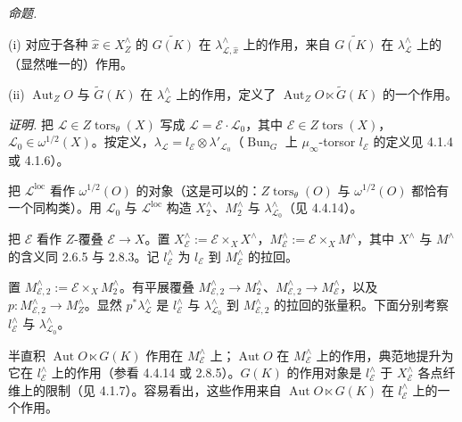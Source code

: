  \emph{命题.}

(i) 对应于各种 $\hat x\in X_{Z}^{\wedge}$ 的 $\widetilde{G(K)}$ 在 $\lambda_{\mathcal{L},\hat x}^{\wedge}$ 上的作用，来自 $\widetilde{G(K)}$ 在 $\lambda_{\mathcal{L}}^{\wedge}$ 上的（显然唯一的）作用。


(ii) $\operatorname{Aut}_Z O$ 与 $\widetilde{G}(K)$ 在 $\lambda_{\mathcal{L}}^{\wedge}$ 上的作用，定义了 $\operatorname{Aut}_Z O\ltimes\widetilde{G}(K)$ 的一个作用。

\emph{证明.} 把 $\mathcal{L}\in Z\operatorname{tors}_{\theta}(X)$ 写成 $\mathcal{L}=\mathcal{E}\cdot\mathcal{L}_0$，其中 $\mathcal{E}\in Z\operatorname{tors}(X)$，$\mathcal{L}_0\in\omega^{1/2}(X)$。按定义，$\lambda_{\mathcal{L}}=l_{\mathcal{E}}\otimes\lambda'_{\mathcal{L}_0}$（$\operatorname{Bun}_G$ 上 $\mu_\infty$-torsor $l_{\mathcal{E}}$ 的定义见 4.1.4 或 4.1.6）。

把 $\mathcal{L}^{\mathrm{loc}}$ 看作 $\omega^{1/2}(O)$ 的对象（这是可以的：$Z\operatorname{tors}_{\theta}(O)$ 与 $\omega^{1/2}(O)$ 都恰有一个同构类）。用 $\mathcal{L}_0$ 与 $\mathcal{L}^{\mathrm{loc}}$ 构造 $X^{\wedge}_2$、$M^{\wedge}_2$ 与 $\lambda^{\wedge}_{\mathcal{L}_0}$（见 4.4.14）。

把 $\mathcal{E}$ 看作 $Z$-覆叠 $\mathcal{E}\to X$。置 $X^{\wedge}_{\mathcal{E}}:=\mathcal{E}\times_X X^{\wedge}$，$M^{\wedge}_{\mathcal{E}}:=\mathcal{E}\times_X M^{\wedge}$，其中 $X^{\wedge}$ 与 $M^{\wedge}$ 的含义同 2.6.5 与 2.8.3。记 $l^{\wedge}_{\mathcal{E}}$ 为 $l_{\mathcal{E}}$ 到 $M^{\wedge}_{\mathcal{E}}$ 的拉回。

置 $M^{\wedge}_{\mathcal{E},2}:=\mathcal{E}\times_X M^{\wedge}_2$。有平展覆叠 $M^{\wedge}_{\mathcal{E},2}\to M^{\wedge}_2$、$M^{\wedge}_{\mathcal{E},2}\to M^{\wedge}_{\mathcal{E}}$，以及 $p:M^{\wedge}_{\mathcal{E},2}\to M^{\wedge}_Z$。显然 $p^*\lambda^{\wedge}_{\mathcal{L}}$ 是 $l^{\wedge}_{\mathcal{E}}$ 与 $\lambda^{\wedge}_{\mathcal{L}_0}$ 到 $M^{\wedge}_{\mathcal{E},2}$ 的拉回的张量积。下面分别考察 $l^{\wedge}_{\mathcal{E}}$ 与 $\lambda^{\wedge}_{\mathcal{L}_0}$。

半直积 $\operatorname{Aut} O\ltimes G(K)$ 作用在 $M^{\wedge}_{\mathcal{E}}$ 上；$\operatorname{Aut} O$ 在 $M^{\wedge}_{\mathcal{E}}$ 上的作用，典范地提升为它在 $l^{\wedge}_{\mathcal{E}}$ 上的作用（参看 4.4.14 或 2.8.5）。$G(K)$ 的作用对象是 $l^{\wedge}_{\mathcal{E}}$ 于 $X^{\wedge}_{\mathcal{E}}$ 各点纤维上的限制（见 4.1.7）。容易看出，这些作用来自 $\operatorname{Aut} O\ltimes G(K)$ 在 $l^{\wedge}_{\mathcal{E}}$ 上的一个作用。

